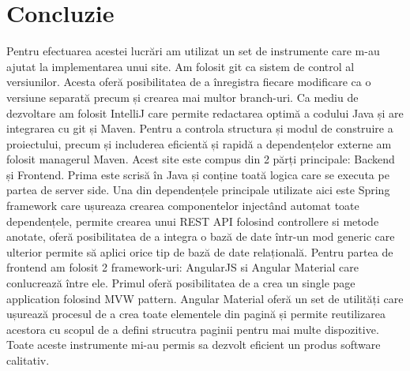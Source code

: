 \section*{Concluzie}

Pentru efectuarea acestei lucrări am utilizat un set de instrumente care m-au ajutat la implementarea unui site. Am folosit git ca sistem de control al versiunilor. Acesta oferă posibilitatea de a înregistra fiecare modificare ca o versiune separată precum și crearea mai multor branch-uri. Ca mediu de dezvoltare am folosit IntelliJ care permite redactarea optimă a codului Java și are integrarea cu git și Maven. Pentru a controla structura și modul de construire a proiectului, precum și includerea eficientă și rapidă a dependențelor externe am folosit managerul Maven. Acest site este compus din 2 părți principale: Backend și Frontend. Prima este scrisă în Java și conține toată logica care se executa pe partea de server side. Una din dependențele principale utilizate aici este Spring framework care ușureaza crearea componentelor injectând automat toate dependențele, permite crearea unui REST API folosind controllere si metode anotate, oferă posibilitatea de a integra o bază de date într-un mod generic care ulterior permite să aplici orice tip de bază de date relațională. Pentru partea de frontend am folosit 2 framework-uri: AngularJS si Angular Material care conlucrează între ele. Primul oferă posibilitatea de a crea un single page application folosind MVW pattern. Angular Material oferă un set de utilități care ușurează procesul de a crea toate elementele din pagină și permite reutilizarea acestora cu scopul de a defini strucutra paginii pentru mai multe dispozitive. Toate aceste instrumente mi-au permis sa dezvolt eficient un produs software calitativ.

\clearpage